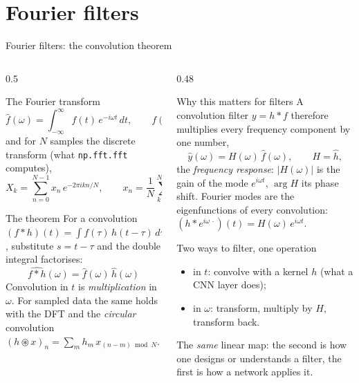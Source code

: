 \documentclass[10pt,aspectratio=169]{beamer}
\begin{document}
\section{Fourier filters}
\begin{frame}{Fourier filters: the convolution theorem}
\scriptsize
\begin{columns}[T]
\begin{column}{0.5\textwidth}
\begin{block}{The Fourier transform}
\[
  \hat f(\omega)=\int_{-\infty}^{\infty}f(t)\,e^{-i\omega t}\,dt,\qquad
  f(t)=\frac{1}{2\pi}\int_{-\infty}^{\infty}\hat f(\omega)\,e^{i\omega t}\,d\omega,
\]
and for $N$ samples the discrete transform (what \texttt{np.fft.fft}
computes),
\[
  X_k=\sum_{n=0}^{N-1}x_n\,e^{-2\pi ikn/N},\qquad
  x_n=\frac{1}{N}\sum_{k=0}^{N-1}X_k\,e^{2\pi ikn/N}.
\]
\end{block}
\begin{block}{The theorem}
For a convolution $(f*h)(t)=\int f(\tau)\,h(t-\tau)\,d\tau$, substitute
$s=t-\tau$ and the double integral factorises:
\[
  \boxed{\;\widehat{f*h}(\omega)=\hat f(\omega)\,\hat h(\omega)\;}
\]
Convolution in $t$ is \emph{multiplication} in $\omega$.  For sampled
data the same holds with the DFT and the \emph{circular} convolution
$(h\circledast x)_n=\sum_mh_m\,x_{(n-m)\bmod N}$.
\end{block}
\end{column}
\begin{column}{0.48\textwidth}
\begin{block}{Why this matters for filters}
A convolution filter $y=h*f$ therefore multiplies every frequency
component by one number,
\[
  \hat y(\omega)=H(\omega)\,\hat f(\omega),\qquad H=\hat h ,
\]
the \emph{frequency response}: $|H(\omega)|$ is the gain of the mode
$e^{i\omega t}$, $\arg H$ its phase shift.  Fourier modes are the
eigenfunctions of every convolution: $(h*e^{i\omega\,\cdot})(t)=H(\omega)\,e^{i\omega t}$.
\end{block}
\begin{block}{Two ways to filter, one operation}
\begin{itemize}
  \item in $t$: convolve with a kernel $h$ (what a CNN layer does);
  \item in $\omega$: transform, multiply by $H$, transform back.
\end{itemize}
The \emph{same} linear map: the second is how one designs or understands
a filter, the first is how a network applies it.
\end{block}
\end{column}
\end{columns}
\end{frame}
\end{document}
